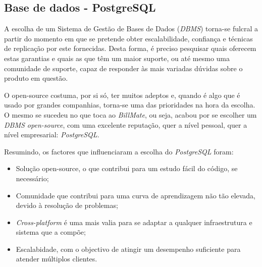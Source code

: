 \subsection{Base de dados - PostgreSQL} 

A escolha de um Sistema de Gestão de Bases de Dados (\emph{DBMS}) torna-se fulcral a partir do momento em que se pretende obter escalabilidade, confiança e técnicas de replicação por este fornecidas. Desta forma, é preciso pesquisar quais oferecem estas garantias e quais as que têm um maior suporte, ou até mesmo uma comunidade de suporte, capaz de responder às mais variadas dúvidas sobre o produto em questão.

O open-source costuma, por si só, ter muitos adeptos e, quando é algo que é usado por grandes companhias, torna-se uma das prioridades na hora da escolha. O mesmo se sucedeu no que toca ao \emph{BillMate}, ou seja, acabou por se escolher um \emph{DBMS open-source}, com uma excelente reputação, quer a nível pessoal, quer a nível empresarial: \emph{PostgreSQL}.

Resumindo, os factores que influenciaram a escolha do \emph{PostgreSQL} foram:
\begin{itemize}
  \item Solução open-source, o que contribui para um estudo fácil do código, se necessário;
  \item Comunidade que contribui para uma curva de aprendizagem não tão elevada, devido à resolução de problemas;
  \item \emph{Cross-platform} é uma mais valia para se adaptar a qualquer infraestrutura e sistema que a compõe;
  \item Escalabidade, com o objectivo de atingir um desempenho suficiente para atender múltiplos clientes.
\end{itemize}